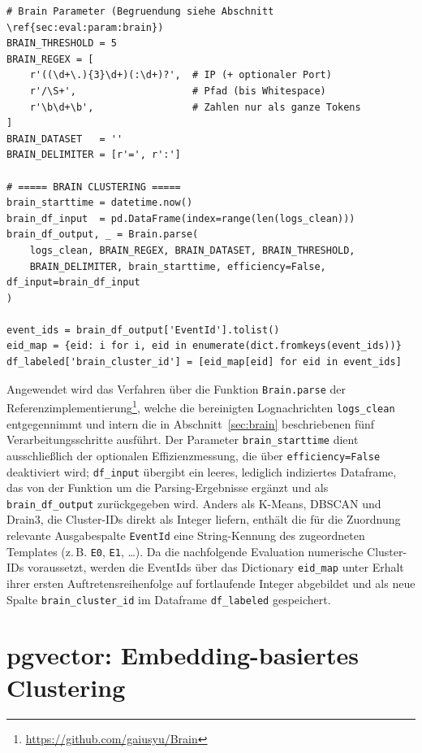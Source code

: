 \begin{lstlisting}[caption={Clustern mit Brain}, label={lst:brain-cluster}]
# Brain Parameter (Begruendung siehe Abschnitt \ref{sec:eval:param:brain})
BRAIN_THRESHOLD = 5
BRAIN_REGEX = [
    r'((\d+\.){3}\d+)(:\d+)?',  # IP (+ optionaler Port)
    r'/\S+',                    # Pfad (bis Whitespace)
    r'\b\d+\b',                 # Zahlen nur als ganze Tokens
]
BRAIN_DATASET   = ''
BRAIN_DELIMITER = [r'=', r':']

# ===== BRAIN CLUSTERING =====
brain_starttime = datetime.now()
brain_df_input  = pd.DataFrame(index=range(len(logs_clean)))
brain_df_output, _ = Brain.parse(
    logs_clean, BRAIN_REGEX, BRAIN_DATASET, BRAIN_THRESHOLD,
    BRAIN_DELIMITER, brain_starttime, efficiency=False, df_input=brain_df_input
)

event_ids = brain_df_output['EventId'].tolist()
eid_map = {eid: i for i, eid in enumerate(dict.fromkeys(event_ids))}
df_labeled['brain_cluster_id'] = [eid_map[eid] for eid in event_ids]
\end{lstlisting}

Angewendet wird das Verfahren über die Funktion \texttt{Brain.parse} der
Referenzimplementierung\footnote{\url{https://github.com/gaiusyu/Brain}},
welche die bereinigten Lognachrichten \texttt{logs\_clean} entgegennimmt und
intern die in Abschnitt~\ref{sec:brain} beschriebenen fünf
Verarbeitungsschritte ausführt. Der Parameter \texttt{brain\_starttime} dient
ausschließlich der optionalen Effizienzmessung, die über
\texttt{efficiency=False} deaktiviert wird; \texttt{df\_input} übergibt ein
leeres, lediglich indiziertes Dataframe, das von der Funktion um die
Parsing-Ergebnisse ergänzt und als \texttt{brain\_df\_output} zurückgegeben
wird. Anders als K-Means, DBSCAN und Drain3, die Cluster-IDs direkt als
Integer liefern, enthält die für die Zuordnung relevante Ausgabespalte
\texttt{EventId} eine String-Kennung des zugeordneten Templates (z.\,B.
\texttt{E0}, \texttt{E1}, \ldots). Da die nachfolgende Evaluation
numerische Cluster-IDs voraussetzt, werden die EventIds über das Dictionary
\texttt{eid\_map} unter Erhalt ihrer ersten Auftretensreihenfolge auf
fortlaufende Integer abgebildet und als neue Spalte
\texttt{brain\_cluster\_id} im Dataframe \texttt{df\_labeled} gespeichert.

\section{pgvector: Embedding-basiertes Clustering}
\label{sec:real:pgvector}


